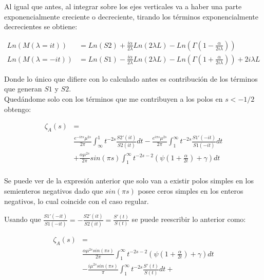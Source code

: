 Al igual que antes, al integrar sobre los ejes verticales va a haber una parte exponencialmente creciente o decreciente, tirando los términos exponencialmente decrecientes se obtiene:


\begin{align}
Ln ( M ( \lambda = i t ) ) &=  Ln(S2) + 
\frac{i \alpha }{2 \lambda} Ln(2 \lambda L) - 
Ln( \Gamma( 1 - \frac{ \alpha}{2 i \lambda} ) ) \\ 
Ln( M ( \lambda = -i t ) ) &= Ln(S1) -  
\frac{i \alpha }{2 \lambda} Ln( 2 \lambda L ) - 
Ln( \Gamma ( 1 + \frac{ \alpha}{2 i \lambda} )) +
2 i \lambda L  \nonumber
\end{align}

Donde lo único que difiere con lo calculado antes es contribución de los términos que generan $S1$ y $S2$. \\




Quedándome solo con los términos que me contribuyen a los polos en  $s < -1/2$ obtengo:

\begin{equation}
\begin{aligned}
 \zeta _A (s) &= \\[10pt]
& \frac{e ^{- i \pi s} \mu ^{2s } }{2 \pi}
\int _{\infty} ^{1} t ^{-2s } 
		\frac{S2' (it)}{S2 (it)}
		d t
	- 
\frac{e ^{i \pi s} \mu ^{2s}}{2 \pi}
\int _{1} ^{\infty} t ^{-2s } 
	\frac{S1' (-it)}{S1(-it)}
	d t 
	 \\[10pt]
	& + \frac{\alpha \mu ^{2s} }{2 \pi }	sin( \pi s)  \int _1 ^{\infty}
	t ^{-2s-2} \left( \psi \left( 1 + \frac{\alpha}{2 t}\right) + \gamma \right) dt \\[15pt]
\end{aligned}
\end{equation}




Se puede ver de la expresión anterior que solo van a existir polos simples en los semienteros negativos dado que $sin(\pi s)$ posee ceros simples en los enteros negativos, lo cual coincide con el caso regular.

Usando que $\frac{S1' (-it)}{S1 (-i t)} = - \frac{S2 ' (i t)}{S2(it)} = \frac{S'(t)}{S(t)}  $ se puede reescribir lo anterior como:

\begin{equation}
\begin{aligned}
\zeta _A (s) &=  \\[5pt]
&
\frac{\alpha \mu ^{2s} sin( \pi s )}{2 \pi } \int _{1} ^{\infty} 
t ^{-2s-2} \left( \psi (1 + \frac{\alpha}{2 t}) + \gamma \right) dt \\[5pt]
& -  \frac{i \mu ^{2s}  sin (\pi s)}{\pi} \int _1 ^{\infty} t ^{-2s} \frac{S'(t)}{S(t)} dt + 
\end{aligned}
\end{equation}



